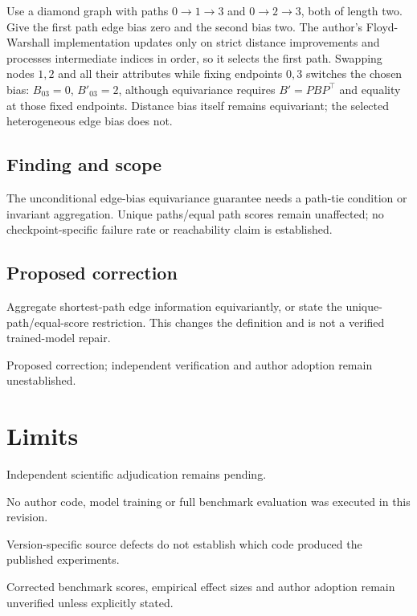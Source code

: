 \documentclass[11pt]{article}
\begin{document}
Use a diamond graph with paths \(0\to1\to3\) and \(0\to2\to3\), both of length two. Give the first path edge bias zero and the second bias two. The author's Floyd-Warshall implementation updates only on strict distance improvements and processes intermediate indices in order, so it selects the first path. Swapping nodes \(1,2\) and all their attributes while fixing endpoints \(0,3\) switches the chosen bias: \(B_{03}=0\), \(B'_{03}=2\), although equivariance requires \(B'=PBP^\top\) and equality at those fixed endpoints. Distance bias itself remains equivariant; the selected heterogeneous edge bias does not.

\subsection*{Finding and scope}

The unconditional edge-bias equivariance guarantee needs a path-tie condition or invariant aggregation. Unique paths/equal path scores remain unaffected; no checkpoint-specific failure rate or reachability claim is established.

\subsection*{Proposed correction}

Aggregate shortest-path edge information equivariantly, or state the unique-path/equal-score restriction. This changes the definition and is not a verified trained-model repair.

Proposed correction; independent verification and author adoption remain unestablished.

\section*{Limits}

Independent scientific adjudication remains pending.\par

No author code, model training or full benchmark evaluation was executed in this revision.\par

Version-specific source defects do not establish which code produced the published experiments.\par

Corrected benchmark scores, empirical effect sizes and author adoption remain unverified unless explicitly stated.\par
\end{document}
